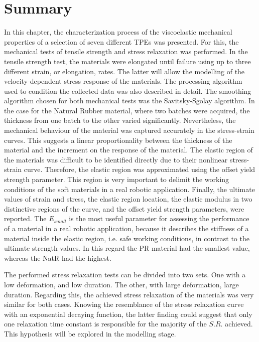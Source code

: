 

\section{Summary}

In this chapter, the characterization process of the viscoelastic mechanical properties of a selection of seven different TPEs was presented. For this, the mechanical tests of tensile strength and stress relaxation was performed. In the tensile strength test, the materials were elongated until failure using up to three different strain, or elongation, rates. The latter will allow the modelling of the velocity-dependent stress response of the materials. The processing algorithm used to condition the collected data was also described in detail. The smoothing algorithm chosen for both mechanical tests was the Savitsky-Sgolay algorithm. In the case for the Natural Rubber material, where two batches were acquired, the thickness from one batch to the other varied significantly. Nevertheless, the mechanical behaviour of the material was captured accurately in the stress-strain curves. This suggests a linear proportionality between the thickness of the material and the increment on the response of the material. The elastic region of the materials was difficult to be identified directly due to their nonlinear stress-strain curve. Therefore, the elastic region was approximated using the offset yield strength parameter. This region is very important to delimit the working conditions of the soft materials in a real robotic application. Finally, the ultimate values of strain and stress, the elastic region location, the elastic modulus in two distinctive regions of the curve, and the offset yield strength parameters, were reported. The $E_{small}$ is the most useful parameter for assessing the performance of a material in a real robotic application, because it describes the stiffness of a material inside the elastic region, i.e. safe working conditions, in contrast to the ultimate strength values. In this regard the PR material had the smallest value, whereas the NatR had the highest.

The performed stress relaxation tests can be divided into two sets. One with a low deformation, and low duration. The other, with large deformation, large duration. Regarding this, the achieved stress relaxation of the materials was very similar for both cases. Knowing the resemblance of the stress relaxation curve with an exponential decaying function, the latter finding could suggest that only one relaxation time constant is responsible for the majority of the $S.R.$ achieved.  This hypothesis will be explored in the modelling stage. 

